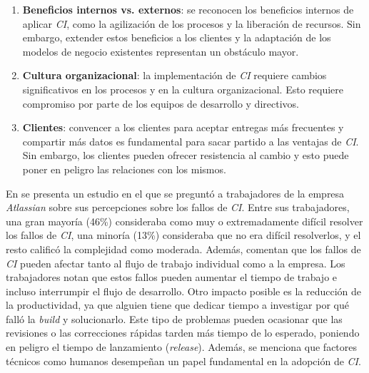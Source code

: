 \begin{enumerate}
	\item \textbf{Beneficios internos vs. externos}: se reconocen los beneficios internos de
      aplicar \textit{CI}, como la agilización de los procesos y la liberación de recursos. Sin
      embargo, extender estos beneficios a los clientes y la adaptación de los modelos de negocio
      existentes representan un obstáculo mayor.
	\item \textbf{Cultura organizacional}: la implementación de \textit{CI} requiere cambios
      significativos en los procesos y en la cultura organizacional. Esto requiere compromiso por
      parte de los equipos de desarrollo y directivos.
	\item \textbf{Clientes}: convencer a los clientes para aceptar entregas más frecuentes y
      compartir más datos es fundamental para sacar partido a las ventajas de \textit{CI}. Sin
      embargo, los clientes pueden ofrecer resistencia al cambio y esto puede poner en peligro
      las relaciones con los mismos.
\end{enumerate}

En \cite{17} se presenta un estudio en el que se preguntó a trabajadores de la empresa
\textit{Atlassian} sobre sus percepciones sobre los fallos de \textit{CI}. Entre sus trabajadores,
una gran mayoría (46\%) consideraba como muy o extremadamente difícil resolver los fallos de
\textit{CI}, una minoría (13\%) consideraba que no era difícil resolverlos, y el resto calificó
la complejidad como moderada. Además, comentan que los fallos de \textit{CI} pueden afectar tanto
al flujo de trabajo individual como a la empresa. Los trabajadores notan que estos fallos pueden
aumentar el tiempo de trabajo e incluso interrumpir el flujo de desarrollo. Otro impacto posible
es la reducción de la productividad, ya que alguien tiene que dedicar tiempo a investigar por qué
falló la \textit{build} y solucionarlo. Este tipo de problemas pueden ocasionar que las revisiones
o las correcciones rápidas tarden más tiempo de lo esperado, poniendo en peligro el tiempo de
lanzamiento (\textit{release}). Además, se menciona que factores técnicos como humanos desempeñan
un papel fundamental en la adopción de \textit{CI}.\\

